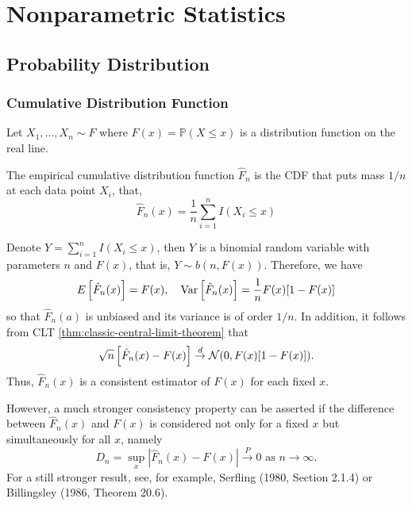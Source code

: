 \chapter{Nonparametric Statistics}

\section{Probability Distribution}

\subsection{Cumulative Distribution Function}

Let $X_{1},\ldots,X_{n}\sim F$ where $F(x)=\mathbb{P}(X\leq x)$ is a distribution function on the real line.

\begin{definition}
	The empirical cumulative distribution function $\widehat{F}_{n}$ is the CDF that puts mass $1/n$ at each data point $X_{i}$, that,
	\begin{equation}
		\widehat{F}_{n}(x)=\frac{1}{n}\sum_{i=1}^{n}I\left(X_{i}\leq x\right)
	\end{equation}
\end{definition}

Denote $Y=\sum_{i=1}^{n}I\left(X_{i}\leq x\right)$, then $Y$ is a binomial random variable with parameters $n$ and $F(x)$, that is, $Y\sim b(n,F(x))$. Therefore, we have
\begin{equation*}
	E\left[\hat{F}_{n}(x)\right]=F(x),\quad\mathrm{Var}\left[\hat{F}_{n}(x)\right]=\frac{1}{n}F(x)[1-F(x)]
\end{equation*}
so that $\hat{F}_{n}(a)$ is unbiased and its variance is of order $1/n$. In addition, it follows from CLT \eqref{thm:classic-central-limit-theorem} that
\begin{equation*}
	\sqrt{n}\left[\hat{F}_{n}(x)-F(x)\right]\stackrel{d}{\rightarrow}{\mathcal N}(0,F(x)[1-F(x)]).
\end{equation*}
Thus, $\hat{F}_{n}(x)$ is a consistent estimator of $F(x)$ for each fixed $x$.

However, a much stronger consistency property can be asserted if the difference between $\hat{F}_{n}(x)$ and $F(x)$ is considered not only for a fixed $x$ but simultaneously for all $x$, namely
\begin{equation*}
	D_{n}=\sup _x\left|\hat{F}_{n}(x)-F(x)\right| \xrightarrow{P} 0 \text { as } n \rightarrow \infty .
\end{equation*}
For a still stronger result, see, for example, Serfling (1980, Section 2.1.4) or Billingsley (1986, Theorem 20.6).


